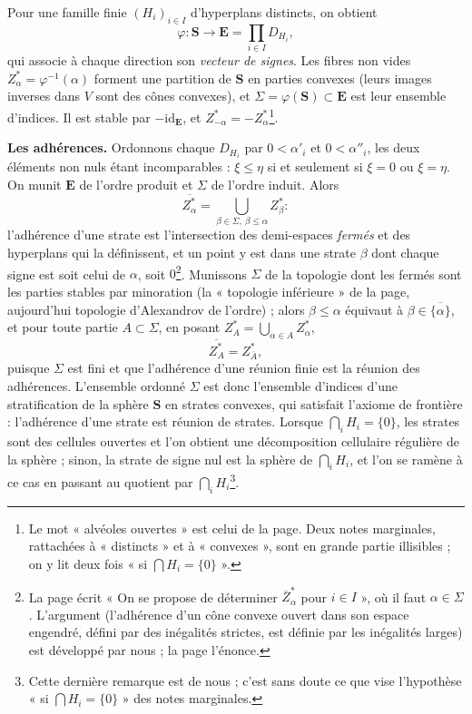 \documentclass[11pt,a4paper]{article}
\begin{document}
Pour une famille finie $(H_i)_{i \in I}$ d'hyperplans distincts, on obtient
\[
\varphi : \mathbf{S} \longrightarrow \mathbf{E} = \prod_{i \in I} D_{H_i},
\]
qui associe à chaque direction son \emph{vecteur de signes}. Les fibres non
vides $Z^{*}_\alpha = \varphi^{-1}(\alpha)$ forment une partition de
$\mathbf{S}$ en parties convexes (leurs images inverses dans $V$ sont des
cônes convexes), et $\Sigma = \varphi(\mathbf{S}) \subset \mathbf{E}$ est leur
ensemble d'indices. Il est stable par $-\mathrm{id}_{\mathbf{E}}$, et
$Z^{*}_{-\alpha} = -Z^{*}_\alpha$\footnote{Le mot « alvéoles ouvertes » est
celui de la page. Deux notes marginales, rattachées à « distincts » et à
« convexes », sont en grande partie illisibles ; on y lit deux fois « si
$\bigcap H_i = \{0\}$ ».}.

\textbf{Les adhérences.} Ordonnons chaque $D_{H_i}$ par $0 < \alpha'_i$ et $0 <
\alpha''_i$, les deux éléments non nuls étant incomparables : $\xi \leqslant
\eta$ si et seulement si $\xi = 0$ ou $\xi = \eta$. On munit $\mathbf{E}$ de
l'ordre produit et $\Sigma$ de l'ordre induit. Alors
\[
\overline{Z^{*}_\alpha} = \bigcup_{\beta \in \Sigma,\ \beta \leqslant \alpha}
Z^{*}_\beta :
\]
l'adhérence d'une strate est l'intersection des demi-espaces \emph{fermés}
et des hyperplans qui la définissent, et un point y est dans une strate
$\beta$ dont chaque signe est soit celui de $\alpha$, soit $0$\footnote{La
page écrit « On se propose de déterminer $\overline{Z}^{*}_\alpha$ pour
$i \in I$ », où il faut $\alpha \in \Sigma$. L'argument (l'adhérence d'un
cône convexe ouvert dans son espace engendré, défini par des inégalités
strictes, est définie par les inégalités larges) est développé par nous ;
la page l'énonce.}. Munissons $\Sigma$ de la topologie dont les fermés sont
les parties stables par minoration (la « topologie inférieure » de la page,
aujourd'hui topologie d'Alexandrov de l'ordre) ; alors $\beta \leqslant
\alpha$ équivaut à $\beta \in \overline{\{\alpha\}}$, et pour toute partie $A
\subset \Sigma$, en posant $Z^{*}_A = \bigcup_{\alpha \in A} Z^{*}_\alpha$,
\[
\overline{Z^{*}_A} = Z^{*}_{\overline{A}},
\]
puisque $\Sigma$ est fini et que l'adhérence d'une réunion finie est la
réunion des adhérences. L'ensemble ordonné $\Sigma$ est donc l'ensemble
d'indices d'une stratification de la sphère $\mathbf{S}$ en strates convexes,
qui satisfait l'axiome de frontière : l'adhérence d'une strate est réunion de
strates. Lorsque $\bigcap_i H_i = \{0\}$, les strates sont des cellules
ouvertes et l'on obtient une décomposition cellulaire régulière de la
sphère ; sinon, la strate de signe nul est la sphère de $\bigcap_i H_i$, et
l'on se ramène à ce cas en passant au quotient par
$\bigcap_i H_i$\footnote{Cette dernière remarque est de nous ; c'est sans
doute ce que vise l'hypothèse « si $\bigcap H_i = \{0\}$ » des notes
marginales.}.
\end{document}
